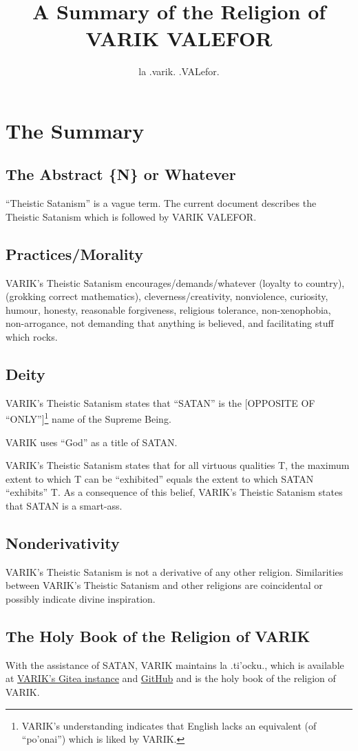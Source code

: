 \documentclass{article}
\title{A Summary of the Religion of VARIK VALEFOR}
\author{la .varik. .VALefor.}
\begin{document}
\maketitle

\section{The Summary}
\subsection{The Abstract \{N\} or Whatever}
``Theistic Satanism'' is a vague term.  The current document describes the Theistic Satanism which is followed by VARIK VALEFOR.

\subsection{Practices/Morality}
VARIK's Theistic Satanism encourages/demands/whatever (loyalty to country), (grokking correct mathematics), cleverness/creativity, nonviolence, curiosity, humour, honesty, reasonable forgiveness, religious tolerance, non-xenophobia, non-arrogance, not demanding that anything is believed, and facilitating stuff which rocks.

\subsection{Deity}
VARIK's Theistic Satanism states that ``SATAN'' is the [OPPOSITE OF ``ONLY'']\footnote{VARIK's understanding indicates that English lacks an equivalent (of ``po'onai'') which is liked by VARIK.} name of the Supreme Being.

VARIK uses ``God'' as a title of SATAN.

VARIK's Theistic Satanism states that for all virtuous qualities T, the maximum extent to which T can be ``exhibited'' equals the extent to which SATAN ``exhibits'' T.  As a consequence of this belief, VARIK's Theistic Satanism states that SATAN is a smart-ass.

\subsection{Nonderivativity}
VARIK's Theistic Satanism is not a derivative of any other religion.  Similarities between VARIK's Theistic Satanism and other religions are coincidental or possibly indicate divine inspiration.

\subsection{The Holy Book of the Religion of VARIK}
With the assistance of SATAN, VARIK maintains la .ti'ocku., which is available at \href{http://git.varikvalefor.i2p/vvx/la-tihocku}{VARIK's Gitea instance} and \href{https://github.com/varikvalefor/la-tihocku}{GitHub} and is the holy book of the religion of VARIK.
\end{document}
